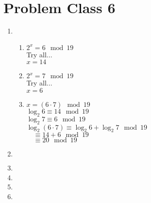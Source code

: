 \section{Problem Class 6}
	\begin{enumerate}
		\item
		\begin{enumerate}
			\item $2^x = 6 \mod 19$\\
				Try all...\\
				$x=14$
			\item $2^x = 7 \mod 19$\\
				Try all...\\
				$x=6$
			\item $x = (6 \cdot 7) \mod 19$\\
			$\log_2 6\equiv 14 \mod 19$\\
			$\log_2 7\equiv 6 \mod 19$\\
			$\log_2 (6\cdot 7) \equiv \log_2 6 + \log_2 7 \mod 19$\\
			$\quad \equiv 14+6 \mod 19$\\
			$\quad \equiv 20 \mod 19$
		\end{enumerate}
		\item $ $
		\item
		\item
		\item
		\item
	\end{enumerate}
